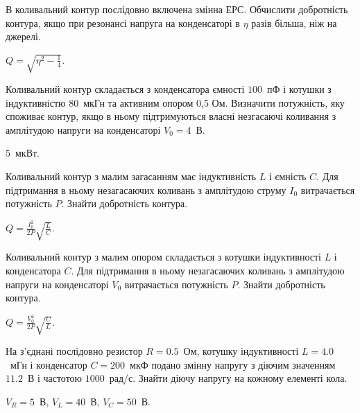\begin{problem}%
В коливальний контур послідовно включена змінна ЕРС. Обчислити
добротність контура, якщо при резонансі напруга на конденсаторі в $\eta$ разів більша, ніж на джерелі.
\begin{solution}
	$Q = \sqrt{\eta^2 - \frac14}$.
\end{solution}
\end{problem}

\begin{problem}%
Коливальний контур складається з конденсатора ємності $100$~пФ і котушки з індуктивністю $80$~мкГн та активним опором 0,5 Ом. Визначити потужність, яку споживає контур, якщо в ньому підтримуються власні незгасаючі коливання з амплітудою напруги на конденсаторі $V_0 = 4$~В.
\begin{solution}
	$5$~мкВт.
\end{solution}
\end{problem}

\begin{problem}%
Коливальний контур з малим загасанням має індуктивність $L$ і ємність
$C$. Для підтримання в ньому незагасаючих коливань з амплітудою струму $I_0$ витрачається потужність $P$. Знайти добротність контура.
\begin{solution}
	$Q = \frac{I_0^2}{2P}\sqrt{\frac{L}{C}}$.
\end{solution}
\end{problem}

\begin{problem}%
Коливальний контур з малим опором складається з котушки індуктивності $L$ і конденсатора $C$. Для підтримання в ньому незагасаючих коливань з
амплітудою напруги на конденсаторі $V_0$ витрачається потужність $P$. Знайти добротність контура.
\begin{solution}
	$Q = \frac{V_0^2}{2P}\sqrt{\frac{C}{L}}$.
\end{solution}
\end{problem}

\begin{problem}%
На з'єднані послідовно резистор $R = 0.5$~Ом, котушку індуктивності
$L = 4.0$~мГн і конденсатор $C = 200$~мкФ подано змінну напругу з діючим значенням $11.2$~В і частотою $1000$~рад/с. Знайти діючу напругу на кожному елементі кола.
\begin{solution}
	$V_R = 5$~В, $V_L = 40$~В, $V_C = 50$~В.
\end{solution}
\end{problem}

